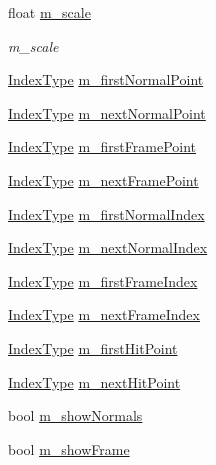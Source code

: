 \begin{DoxyCompactItemize}
float \mbox{\hyperlink{class_g_l_body_a82266ebb17e8932521180ca9626c314c}{m\+\_\+scale}}
\begin{DoxyCompactList}\small\item\em m\+\_\+scale \end{DoxyCompactList}\item 
\mbox{\hyperlink{gldefines_8h_af3c748960f29c42e5b7f1dc449ab66ff}{Index\+Type}} \mbox{\hyperlink{class_g_l_body_a790f0028b0ad3c1e08a9c7314fbb91ea}{m\+\_\+first\+Normal\+Point}}
\item 
\mbox{\hyperlink{gldefines_8h_af3c748960f29c42e5b7f1dc449ab66ff}{Index\+Type}} \mbox{\hyperlink{class_g_l_body_a43978300a750a5c67e474a576ac3ad3c}{m\+\_\+next\+Normal\+Point}}
\item 
\mbox{\hyperlink{gldefines_8h_af3c748960f29c42e5b7f1dc449ab66ff}{Index\+Type}} \mbox{\hyperlink{class_g_l_body_a1b14db868b9e81a32a935f6bdaeba118}{m\+\_\+first\+Frame\+Point}}
\item 
\mbox{\hyperlink{gldefines_8h_af3c748960f29c42e5b7f1dc449ab66ff}{Index\+Type}} \mbox{\hyperlink{class_g_l_body_a1af4cb49c0510aa2afe09670689f3911}{m\+\_\+next\+Frame\+Point}}
\item 
\mbox{\hyperlink{gldefines_8h_af3c748960f29c42e5b7f1dc449ab66ff}{Index\+Type}} \mbox{\hyperlink{class_g_l_body_a3deb492827b145e78753bb69da5a1273}{m\+\_\+first\+Normal\+Index}}
\item 
\mbox{\hyperlink{gldefines_8h_af3c748960f29c42e5b7f1dc449ab66ff}{Index\+Type}} \mbox{\hyperlink{class_g_l_body_af69d3ddae94f6a09446970f97ded2cc5}{m\+\_\+next\+Normal\+Index}}
\item 
\mbox{\hyperlink{gldefines_8h_af3c748960f29c42e5b7f1dc449ab66ff}{Index\+Type}} \mbox{\hyperlink{class_g_l_body_a6db51835ac52260561d8f93ce1e55c15}{m\+\_\+first\+Frame\+Index}}
\item 
\mbox{\hyperlink{gldefines_8h_af3c748960f29c42e5b7f1dc449ab66ff}{Index\+Type}} \mbox{\hyperlink{class_g_l_body_aef3425aa1efb75b2c758b83372d427d1}{m\+\_\+next\+Frame\+Index}}
\item 
\mbox{\hyperlink{gldefines_8h_af3c748960f29c42e5b7f1dc449ab66ff}{Index\+Type}} \mbox{\hyperlink{class_g_l_body_abd2520f3e746310a122729a26ce32b9f}{m\+\_\+first\+Hit\+Point}}
\item 
\mbox{\hyperlink{gldefines_8h_af3c748960f29c42e5b7f1dc449ab66ff}{Index\+Type}} \mbox{\hyperlink{class_g_l_body_af5eb940d625aee425a9fcff361e75d2b}{m\+\_\+next\+Hit\+Point}}
\item 
bool \mbox{\hyperlink{class_g_l_body_a4707235e9ca92fd90399fb785759d946}{m\+\_\+show\+Normals}}
\item 
bool \mbox{\hyperlink{class_g_l_body_af6486869505b4269277a13734acc9bcd}{m\+\_\+show\+Frame}}
\end{DoxyCompactItemize}


